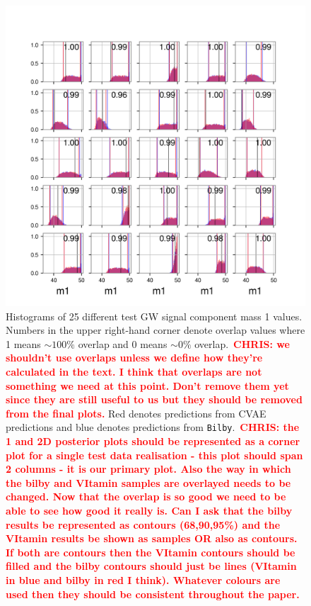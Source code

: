 \documentclass[%
showpacs,
 amsmath,amssymb,
 aps,
 twocolumn,
 prl,
 reprint,
floatfix,
]{revtex4-1}
\newcommand{\chris}[1]{\textbf{\textcolor{red}{CHRIS: #1}}}
\begin{document}
%
%
\begin{figure}
    \includegraphics[width=\columnwidth]{images/latest-1d_0.png}
    \caption{\label{fig:1D_overlap} Histograms of 25 different test GW signal
component mass 1 values.  Numbers in the upper right-hand corner denote overlap
values where 1 means $\sim{100}\%$ overlap and 0 means $\sim{0}\%$
overlap.~\chris{we shouldn't use overlaps unless we define how they're
calculated in the text. I think that overlaps are not something we need at this
point. Don't remove them yet since they are still useful to us but they should
be removed from the final plots.} Red denotes predictions from CVAE predictions
and blue denotes predictions from \texttt{Bilby}.~\chris{the 1 and 2D posterior
plots should be represented as a corner plot for a single test data realisation
- this plot should span 2 columns - it is our primary plot. Also the way in
which the bilby and VItamin samples are overlayed needs to be changed. Now that
the overlap is so good we need to be able to see how good it really is. Can I
ask that the bilby results be represented as contours (68,90,95\%) and the
VItamin results be shown as samples OR also as contours. If both are contours
then the VItamin contours should be filled and the bilby contours should just
be lines (VItamin in blue and bilby in red I think). Whatever colours are used
then they should be consistent throughout the paper.}}
\end{figure}
\end{document}

